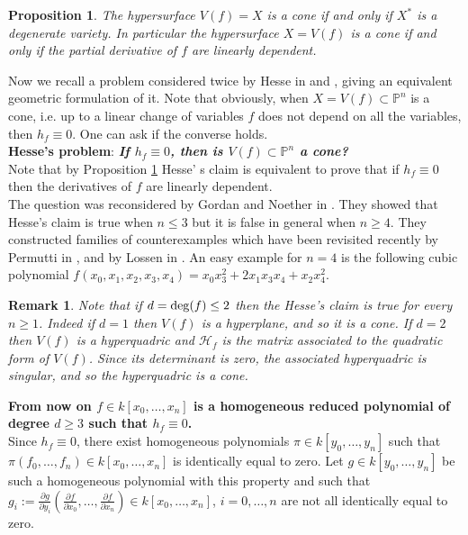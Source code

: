 \documentclass[11pt,a4paper]{amsart}
\newtheorem{rem}[theorem]{Remark}
\newtheorem{prop}[theorem]{Proposition}
\newcommand{\PP}{ \mathbb{P}}
\newcommand{\ch}{\mathcal{H}}
\begin{document}
\begin{prop}\label{prop: cone iff degenerate}
The hypersurface $V(f)=X$ is a cone if and only if $X^*$ is a
degenerate variety. In particular the hypersurface $X=V(f)$ is a
cone if and only if the partial derivative of $f$ are linearly
dependent.
\end{prop}

Now we recall a problem considered twice by Hesse in \cite{Hesse1}
and \cite{Hesse2}, giving an equivalent geometric formulation of
it. Note that obviously, when $X=V(f)\subset\PP^n$ is a cone, i.e.
up to a linear change of variables $f$ does not depend on all the
variables, then $h_f\equiv 0$. One can ask if the converse
holds.\\

\textbf{Hesse's problem}:  {\it \bf If $h_f\equiv 0$,  then
is $V(f)\subset\PP^n$
a cone?}\\


Note that by Proposition \ref{prop: cone iff degenerate}
Hesse' s claim is equivalent to prove that if $h_f\equiv 0$ then the derivatives of $f$ are linearly dependent.\\
The question was reconsidered by  Gordan and Noether in
\cite{Gordan Noether}. They showed that Hesse's claim is true when
$n\leq 3$ but it is false in general when $n\geq 4$. They
constructed families of counterexamples which have been revisited
recently by Permutti in \cite{Permutti1}, \cite{Permutti2} and by
Lossen in \cite{Lossen}. An easy  example for $n=4$ is the following cubic polynomial
$f(x_0,x_1,x_2,x_3,x_4)=x_0x_3^2+2x_1x_3x_4+x_2x_4^2$.

\begin{rem} {\rm Note that if  $d={\rm deg}(f)\leq 2$ then the Hesse's
claim is true for every $n\geq 1$. Indeed if $d=1$ then $V(f)$ is
a hyperplane, and so it is a cone. If $d=2$ then $V(f)$ is a
hyperquadric and $\ch_f$ is the matrix associated to the quadratic
form of $V(f)$. Since its determinant is zero, the associated
hyperquadric is singular, and so the hyperquadric is a cone. }
\end{rem}

\textbf{From now on $f\in
k[x_0,\ldots,x_n]$ is a homogeneous reduced  polynomial of degree $d\geq 3$ such that
$h_f\equiv 0$.}\\

Since $h_f\equiv 0$, there exist homogeneous polynomials $\pi\in
k[y_0,\ldots , y_n]$ such that $\pi(f_0,\ldots,f_n)\in
k[x_0,\ldots,x_n]$ is identically equal to zero. Let $g\in
k[y_0,\ldots , y_n]$ be such a homogeneous polynomial with this
property and such that $g_i:=\frac{\partial g}{\partial
y_i}(\frac{\partial f}{\partial x_0},\ldots ,\frac{\partial
f}{\partial x_n})\in k[x_0,\ldots , x_n]$, $i=0,\ldots ,n$ are not
all identically equal to zero.
\end{document}
